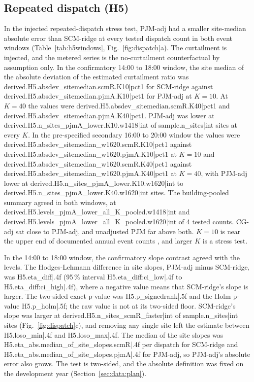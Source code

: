 \subsection{Repeated dispatch (H5)}\label{sec:results:h5}

In the injected repeated-dispatch stress test, PJM-adj had a smaller site-median absolute error than SCM-ridge at every tested dispatch count in both event windows (Table~\ref{tab:h5windows}, Fig.~\ref{fig:dispatch}a). The curtailment is injected, and the metered series is the no-curtailment counterfactual by assumption only. In the confirmatory 14:00 to 18:00 window, the site median of the absolute deviation of the estimated curtailment ratio was {{derived.H5.absdev_sitemedian.scmR.K10|pct1}} for SCM-ridge against {{derived.H5.absdev_sitemedian.pjmA.K10|pct1}} for PJM-adj at $K=10$. At $K=40$ the values were {{derived.H5.absdev_sitemedian.scmR.K40|pct1}} and {{derived.H5.absdev_sitemedian.pjmA.K40|pct1}}. PJM-adj was lower at {{derived.H5.n_sites_pjmA_lower.K10.w1418|int}} of {{sample.n_sites|int}} sites at every $K$. In the pre-specified secondary 16:00 to 20:00 window the values were {{derived.H5.absdev_sitemedian_w1620.scmR.K10|pct1}} against {{derived.H5.absdev_sitemedian_w1620.pjmA.K10|pct1}} at $K=10$ and {{derived.H5.absdev_sitemedian_w1620.scmR.K40|pct1}} against {{derived.H5.absdev_sitemedian_w1620.pjmA.K40|pct1}} at $K=40$, with PJM-adj lower at {{derived.H5.n_sites_pjmA_lower.K10.w1620|int}} to {{derived.H5.n_sites_pjmA_lower.K40.w1620|int}} sites. The building-pooled summary agreed in both windows, at {{derived.H5.levels_pjmA_lower_all_K_pooled.w1418|int}} and {{derived.H5.levels_pjmA_lower_all_K_pooled.w1620|int}} of 4 tested counts. CG-adj sat close to PJM-adj, and unadjusted PJM far above both. $K=10$ is near the upper end of documented annual event counts \cite{kiliccote2010,nyiso2024dr}, and larger $K$ is a stress test.

In the 14:00 to 18:00 window, the confirmatory slope contrast agreed with the levels. The Hodges-Lehmann difference in site slopes, PJM-adj minus SCM-ridge, was {{H5.eta_diff|.4f}} (95\,\% interval {{H5.eta_diff:ci_low|.4f}} to {{H5.eta_diff:ci_high|.4f}}), where a negative value means that SCM-ridge's slope is larger. The two-sided exact p-value was {{H5.p_signedrank|.5f}} and the Holm p-value {{H5.p_holm|.5f}}; the raw value is not at its two-sided floor. SCM-ridge's slope was larger at {{derived.H5.n_sites_scmR_faster|int}} of {{sample.n_sites|int}} sites (Fig.~\ref{fig:dispatch}c), and removing any single site left the estimate between {{H5.loso_min|.4f}} and {{H5.loso_max|.4f}}. The median of the site slopes was {{H5.eta_abs.median_of_site_slopes.scmR|.4f}} per dispatch for SCM-ridge and {{H5.eta_abs.median_of_site_slopes.pjmA|.4f}} for PJM-adj, so PJM-adj's absolute error also grows. The test is two-sided, and the absolute definition was fixed on the development year (Section~\ref{sec:data:plan}).

